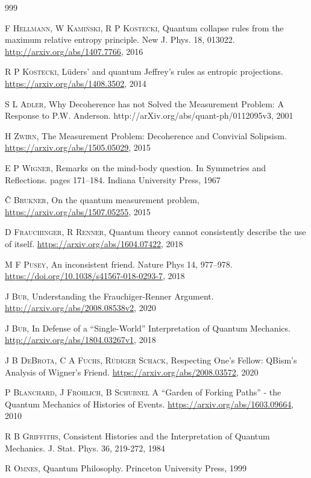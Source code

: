 \documentclass[11pt]{report}
\renewenvironment{thebibliography}[1]{\begin{oldthebibliography}{#1}\setlength{\itemsep}{0.45em}\setlength{\parskip}{0em}}{\end{oldthebibliography}}
\begin{document}
\begin{thebibliography}{999}
\begin{small}
		\textsc{F Hellmann, W Kami\'nski, R P Kostecki,}
		{Quantum collapse rules from the maximum relative entropy principle}.
		New J. Phys. 18, 013022. \url{http://arxiv.org/abs/1407.7766}, 2016
		
		\textsc{R P Kostecki,}
		{L\"uders' and quantum Jeffrey's rules as entropic projections}.
		\url{https://arxiv.org/abs/1408.3502}, 2014
		
		\textsc{S L Adler,}
		{Why Decoherence has not Solved the Measurement Problem: A Response to P.W. Anderson}.
		http://arXiv.org/abs/quant-ph/0112095v3, 2001
		
		\textsc{H Zwirn,}
		{The Measurement Problem: Decoherence and Convivial Solipsism}.
		\url{https://arxiv.org/abs/1505.05029}, 2015
		
		\textsc{E P Wigner,}
		{Remarks on the mind-body question. In Symmetries and Reflections.} 
		pages 171–184. Indiana University Press, 1967
		
		\textsc{\^C Brukner,}
		{On the quantum measurement problem,}
		\url{https://arxiv.org/abs/1507.05255}, 2015
		
		\textsc{D Frauchinger, R Renner,}
		Quantum theory cannot consistently describe the use of itself.
		\url{https://arxiv.org/abs/1604.07422}, 2018
		
		\textsc{M F Pusey,}
		{An inconsistent friend}.
		Nature Phys 14, 977–978. \url{https://doi.org/10.1038/s41567-018-0293-7}, 2018
		
		\textsc{J Bub,}
		{Understanding the Frauchiger-Renner Argument.}
		\url{http://arxiv.org/abs/2008.08538v2}, 2020
		
		\textsc{J Bub,}
		In Defense of a ``Single-World'' Interpretation of Quantum Mechanics.
		\url{http://arxiv.org/abs/1804.03267v1}, 2018
		
		\textsc{J B DeBrota, C A Fuchs, R\"udiger Schack,}
		Respecting One's Fellow: QBism's Analysis of Wigner's Friend.
		\url{https://arxiv.org/abs/2008.03572}, 2020
		
		\textsc{P Blanchard, J Fr\"ohlich, B Schubnel}
		{A ``Garden of Forking Paths'' - the Quantum Mechanics of Histories of Events}.
		\url{https://arxiv.org/abs/1603.09664}, 2010
		
		\textsc{R B Griffiths,}
		{Consistent Histories and the Interpretation of Quantum Mechanics}.
		J. Stat. Phys. 36, 219-272, 1984
		
		\textsc{R Omnes,}
		{Quantum Philosophy}.
		Princeton University Press, 1999
		\end{small}
	\end{thebibliography}
\end{document}
